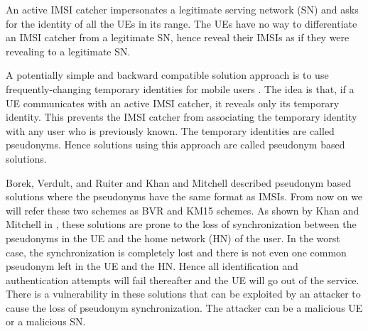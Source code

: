 \documentclass{llncs} %
\begin{document}
An active IMSI catcher impersonates a legitimate serving network (SN) and asks for the identity of all the UEs in its range. The UEs have no way to differentiate an IMSI catcher from a legitimate SN, hence reveal their IMSIs as if they were revealing to a legitimate SN. 



A potentially simple and backward compatible solution approach is to use frequently-changing temporary identities for mobile users \cite{CCS15,SSR15,Ginzboorg_Niemi_2016,Norrman_Naslund_Dubrova_2016,yemen2017}. The idea is that, if a UE communicates with an active IMSI catcher, it reveals only its temporary identity. This prevents the IMSI catcher from associating the temporary identity with any user who is previously known. The temporary identities are called pseudonyms. Hence solutions using this approach are called pseudonym based solutions. 

Borek, Verdult, and Ruiter \cite{CCS15} and Khan and Mitchell \cite{SSR15} described pseudonym based solutions where the pseudonyms have the same format as IMSIs. From now on we will refer these two schemes as BVR and KM15 schemes. As shown by Khan and Mitchell in \cite{wisec17}, these solutions are prone to the loss of synchronization between the pseudonyms in the UE and the home network (HN) of the user. In the worst case, the synchronization is completely lost and there is not even one common pseudonym left in the UE and the HN. Hence all identification and authentication attempts will fail thereafter and the UE will go out of the service. There is a vulnerability in these solutions that can be exploited by an attacker to cause the loss of pseudonym synchronization. The attacker can be a malicious UE or a malicious SN.
\end{document}
